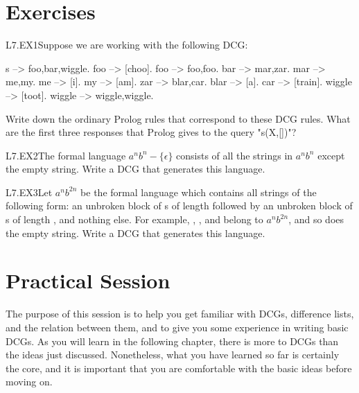 \section{Exercises}\label{SEC.L7.EXERCISES}

\begin{LPNexercise}{L7.EX1}Suppose we are working with the following DCG:
\begin{LPNcodedisplay}
s --> foo,bar,wiggle.
foo --> [choo].
foo --> foo,foo.
bar --> mar,zar.
mar --> me,my.
me --> [i].
my --> [am].
zar --> blar,car.
blar --> [a].
car --> [train].
wiggle --> [toot].
wiggle --> wiggle,wiggle.
\end{LPNcodedisplay}
Write down the ordinary Prolog rules that correspond to these
DCG rules.
What are the first three responses that Prolog gives to the query
"s(X,[])"?
\end{LPNexercise}


\begin{LPNexercise}{L7.EX2}The formal language $a^nb^n - \{\epsilon\}$ consists of all the strings in
$a^nb^n$ except the empty string. Write a DCG that generates this
language.
\end{LPNexercise}


\begin{LPNexercise}{L7.EX3}Let $a^nb^{2n}$ be the formal language which contains all strings of
the following form: an unbroken block of s of length 
followed by an unbroken block of s of length , and
nothing else. For example, , , and 
belong to $a^nb^{2n}$, and so does the empty string.  Write a DCG that
generates this language.
 \end{LPNexercise}


\section{Practical Session}\label{SEC.L7.PRAXIS}



The purpose of this session is to help you get familiar with DCGs,
difference lists, and the relation between them, and to give you some
experience in writing basic DCGs.  As you will learn in the following
chapter, there is more to DCGs than the ideas just
discussed. Nonetheless, what you have learned so far is certainly the
core, and it is important that you are comfortable with the basic
ideas before moving on.

